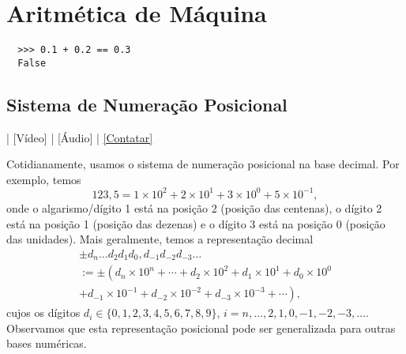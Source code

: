 
\chapter{Aritmética de Máquina}\label{cap_aritm}
\thispagestyle{fancy}

\begin{lstlisting}
  >>> 0.1 + 0.2 == 0.3
  False
\end{lstlisting}

\section{Sistema de Numeração Posicional}\label{cap_aritm_sec_sisnumpos}

\begin{flushright}
  [YouTube] | [Vídeo] | [Áudio] | \href{https://phkonzen.github.io/notas/contato.html}{[Contatar]}
\end{flushright}

Cotidianamente, usamos o sistema de numeração posicional na base decimal. Por exemplo, temos
\begin{equation}
  123,5 = 1\times 10^2 + 2\times 10^1 + 3\times 10^0 + 5\times 10^{-1},
\end{equation}
onde o algarismo/dígito 1 está na posição 2 (posição das centenas), o dígito 2 está na posição 1 (posição das dezenas) e o dígito 3 está na posição 0 (posição das unidades). Mais geralmente, temos a representação decimal
\begin{gather}
  \pm d_n\ldots d_2d_1d_0,d_{-1}d_{-2}d_{-3}\ldots \\
  := \pm \left(d_n\times 10^n + \cdots + d_2\times 10^2 + d_1\times 10^1 + d_0\times 10^0\right. \\
      \left. + d_{-1}\times 10^{-1} + d_{-2}\times 10^{-2} + d_{-3}\times 10^{-3} + \cdots\right),
\end{gather}
cujos os dígitos $d_i \in \{0, 1, 2, 3, 4, 5, 6, 7, 8, 9\}$, $i=n, \dotsc, 2, 1, 0, -1, -2, -3, \ldots$. Observamos que esta representação posicional pode ser generalizada para outras bases numéricas.

